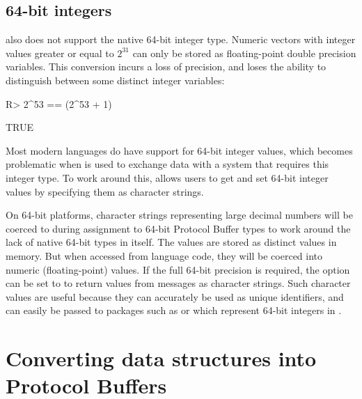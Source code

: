 \documentclass[article]{jss}
\begin{document}
\subsection{64-bit integers}
\label{sec:int64}

 also does not support the native 64-bit integer type. Numeric vectors
with integer values greater or equal to $2^{31}$ can only be stored as
floating-point double precision variables. This conversion incurs a loss of
precision, and  loses the ability to distinguish between some
distinct integer variables:
%
\begin{Schunk}
\begin{Sinput}
R> 2^53 == (2^53 + 1)
\end{Sinput}
\begin{Soutput}
[1] TRUE
\end{Soutput}
\end{Schunk}
%
Most modern languages do have support for 64-bit integer values, 
which becomes problematic when  is used to exchange data 
with a system that requires this integer type. To work around this, 
 allows users to get and set 64-bit integer values by specifying 
them as character strings.

On 64-bit platforms, character strings representing large decimal
numbers will be coerced to  during assignment to 64-bit Protocol
Buffer types to work around the lack of native 64-bit types in  itself.  The
values are stored as distinct  values in memory. But when accessed
from  language code, they will be coerced into numeric
(floating-point) values.  If the
full 64-bit precision is required, the 
option can be set to  to return  values from messages as character
strings.  Such character values are useful because they can
accurately be used as unique identifiers, and can easily be passed to 
packages such as  \citep{int64} or 
\citep{bit64} which represent 64-bit integers in .

\section[Converting R data structures into Protocol
Buffers]{Converting  data structures into Protocol
  Buffers}
\label{sec:evaluation}
\end{document}
